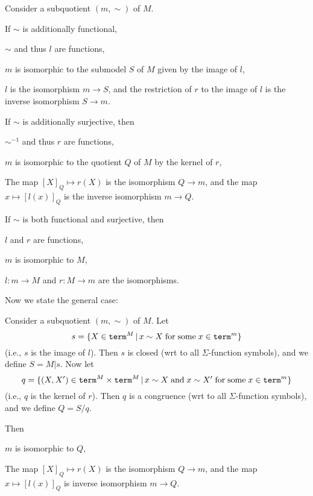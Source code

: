 \begin{theorem}
Consider a subquotient $(m,\sim)$ of $M$.

If $\sim$ is additionally functional,
\begin{compactitem}
 \item $\sim$ and thus $l$ are functions,
 \item $m$ is isomorphic to the submodel $S$ of $M$ given by the image of $l$,
 \item $l$ is the isomorphism $m\to S$, and the restriction of $r$ to the image of $l$ is the inverse isomorphism $S\to m$.
\end{compactitem}

If $\sim$ is additionally surjective, then
\begin{compactitem}
 \item $\sim^{-1}$ and thus $r$ are functions,
 \item $m$ is isomorphic to the quotient $Q$ of $M$ by the kernel of $r$,
 \item The map $[X]_Q\mapsto r(X)$ is the isomorphism $Q\to m$, and the map $x\mapsto [l(x)]_Q$ is the inverse isomorphism $m\to Q$.
\end{compactitem}

If $\sim$ is both functional and surjective, then
\begin{compactitem}
\item $l$ and $r$ are functions,
\item $m$ is isomorphic to $M$,
\item $l:m\to M$ and $r:M\to m$ are the isomorphisms.
\end{compactitem}
\end{theorem}

Now we state the general case:

\begin{theorem}
Consider a subquotient $(m,\sim)$ of $M$.
Let \[s=\{X\in\mathtt{term}^M \,|\, x\sim X\;\mathrm{for}\;\mathrm{some}\; x\in\mathtt{term}^m\}\] (i.e., $s$ is the image of $l$).
Then $s$ is closed (wrt to all $\Sigma$-function symbols), and we define $S=M|s$.
Now let \[q=\{(X,X')\in\mathtt{term}^M\times\mathtt{term}^M\,|\,x\sim X\;\mathrm{and}\; x\sim X'\;\mathrm{for}\;\mathrm{some}\; x\in\mathtt{term}^m\}\]
(i.e., $q$ is the kernel of $r$).
Then $q$ is a congruence (wrt to all $\Sigma$-function symbols), and we define $Q=S/q$.

Then
\begin{compactitem}
 \item $m$ is isomorphic to $Q$,
 \item The map $[X]_Q\mapsto r(X)$ is the isomorphism $Q\to m$, and the map $x\mapsto [l(x)]_Q$ is inverse isomorphism $m\to Q$.
\end{compactitem}
\end{theorem}

